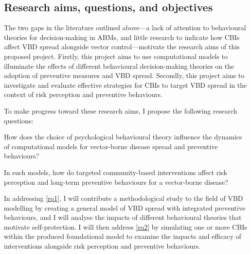 \subsection{Research aims, questions, and objectives}\label{sec:research-aims}

The two gaps in the literature outlined above---a lack of attention to behavioural theories for decision-making in ABMs, and little research to indicate how CBIs affect VBD spread alongside vector control---motivate the research aims of this proposed project. Firstly, this project aims to use computational models to illuminate the effects of different behavioural decision-making theories on the adoption of preventive measures and VBD spread. Secondly, this project aims to investigate and evaluate effective strategies for CBIs to target VBD spread in the context of risk perception and preventive behaviours.

To make progress toward these research aims, I propose the following research questions:

\begin{questions}



\item How does the choice of psychological behavioural theory influence the dynamics of computational models for vector-borne disease spread and preventive behaviours?\label{rq1}

\item In such models, how do targeted community-based interventions affect risk perception and long-term preventive behaviours for a vector-borne disease?\label{rq2}

\end{questions}

In addressing \ref{rq1}, I will contribute a methodological study to the field of VBD modelling by creating a general model of VBD spread with integrated preventive behaviours, and I will analyse the impacts of different behavioural theories that motivate self-protection. I will then address \ref{rq2} by simulating one or more CBIs within the produced foundational model to examine the impacts and efficacy of interventions alongside risk perception and preventive behaviours.

